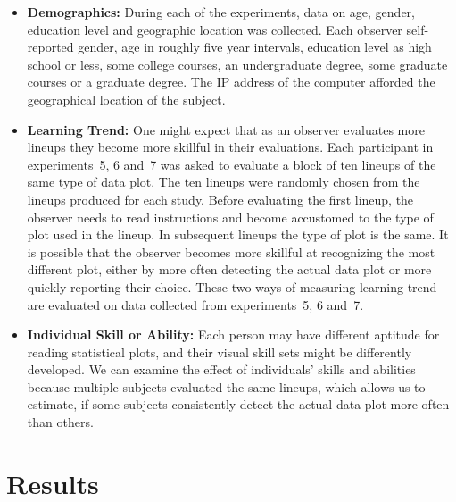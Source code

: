 \documentclass[10pt]{article}\usepackage[]{graphicx}\usepackage[]{xcolor}
\begin{document}
\begin{itemize} \itemsep 0in \parsep-10pt %
 
\item{\bf Demographics:}  During each of the experiments, data on age, gender, education level and geographic location was collected. Each observer self-reported gender, age in roughly five year intervals, education level as high school or less, some college courses, an undergraduate degree, some graduate courses or a graduate degree. The IP address of the computer afforded the geographical location of the subject.

\item{\bf Learning Trend:} One might expect that as an observer evaluates more lineups they  become more skillful in their evaluations. Each participant in  experiments~5, 6 and~7 was asked to evaluate a block of  ten lineups of the same type of data plot. The ten lineups were randomly chosen from the lineups  produced for each study. Before evaluating the first lineup, the observer needs to read instructions and become accustomed to the type of plot used in the lineup. In subsequent lineups  the type of plot is the same. It is possible that the observer becomes more skillful at recognizing the most different plot, either by more often detecting the actual data plot or more quickly reporting their choice. These two ways of measuring learning trend are evaluated on data collected from experiments~5, 6 and~7.


\item{\bf Individual Skill or Ability:} Each person may have different  aptitude for reading statistical plots, and their visual skill sets might be differently developed.  We can examine the effect of individuals' skills and abilities because multiple subjects evaluated the same lineups, which allows us to estimate, if some subjects consistently detect the actual data plot more often than others.  

\end{itemize}



\section{Results}\label{sec:result_socio}
\end{document}
